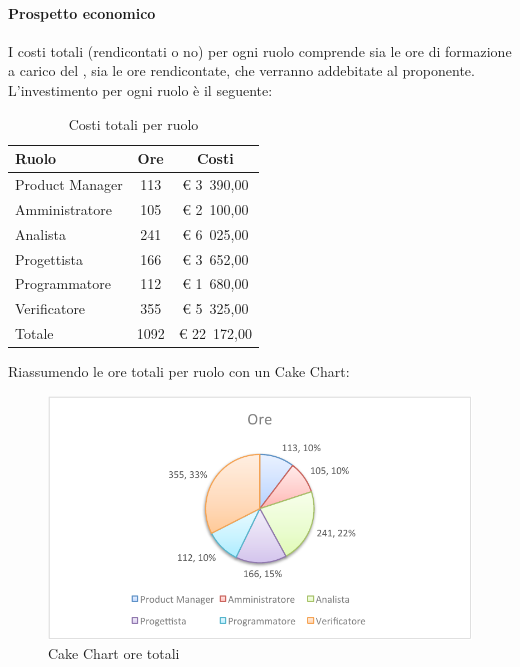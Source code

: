 			\paragraph{Prospetto economico}
				I costi totali (rendicontati o no) per ogni ruolo comprende sia le ore di formazione a carico del \groupname{}, sia le ore rendicontate, che verranno addebitate al proponente.\\
				L'investimento per ogni ruolo è il seguente:
				\begin{table}[H]
					\begin{center}
						\begin{tabular}{| l | c | c |}
							\hline
							Ruolo 			& Ore 	& Costi  \\ \hline
							
							Product Manager	& 113 	& \euro{} 3~390,00 	\\
							Amministratore 		& 105 	& \euro{} 2~100,00 	\\
							Analista	 		& 241 	& \euro{} 6~025,00 	\\
							Progettista 		& 166	& \euro{} 3~652,00 	\\
							Programmatore		& 112	& \euro{} 1~680,00	\\
							Verificatore		& 355 	& \euro{} 5~325,00 	\\ \hline \hline
							
							Totale	 		& 1092 	& \euro{} 22~172,00 	\\ \hline
						\end{tabular}
					\end{center}
					\caption{Costi totali per ruolo}
				\end{table}
				Riassumendo le ore totali per ruolo con un Cake Chart:
				\begin{figure}[H]\centering
					\includegraphics[width=\textwidth]{PianoDiProgetto/Pics/ChartTotOre.pdf}
					\caption{Cake Chart ore totali}
				\end{figure}
